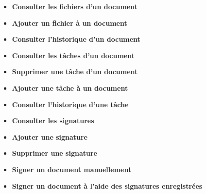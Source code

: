 \begin{itemize}
\item \textbf{Consulter les fichiers d'un document}
\item \textbf{Ajouter un fichier à un document}
\item \textbf{Consulter l'historique d'un document}
\item \textbf{Consulter les tâches d'un document}
\item \textbf{Supprimer une tâche d'un document}
\item \textbf{Ajouter une tâche à un document}
\item \textbf{Consulter l'historique d'une tâche}
\item \textbf{Consulter les signatures}
\item \textbf{Ajouter une signature}
\item \textbf{Supprimer une signature}
\item \textbf{Signer un document manuellement}
\item \textbf{Signer un document à l'aide des signatures enregistrées}

\end{itemize}





